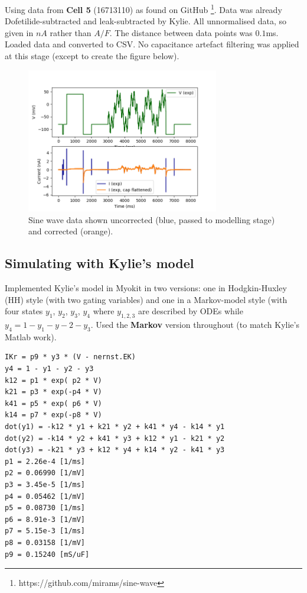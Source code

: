 \documentclass[preprint,authoryear,10pt]{elsarticle}
\begin{document}
Using data from \textbf{Cell 5} (16713110) as found on GitHub
 \footnote{https://github.com/mirams/sine-wave}.
Data was already Dofetilide-subtracted and leak-subtracted by Kylie.
All unnormalised data, so given in $nA$ rather than $A/F$.
The distance between data points was $0.1$ms.
Loaded data and converted to CSV.
No capacitance artefact filtering was applied at this stage (except to create
 the figure below).

\begin{figure}[H]
\centerline{
\includegraphics[width=0.75\textwidth]{fig/sine-wave-data}
}
\caption{%
Sine wave data shown uncorrected (blue, passed to modelling stage) and
 corrected (orange).
}
\label{fig:overview}
\end{figure}



\subsection{Simulating with Kylie's model}

Implemented Kylie's model in Myokit in two versions: one in Hodgkin-Huxley (HH)
 style (with two gating variables) and one in a Markov-model style (with four
 states $y_1$, $y_2$, $y_3$, $y_4$ where $y_{1,2,3}$ are described by ODEs
 while $y_4 = 1 - y_1 - y-2 - y_3$.
Used the \textbf{Markov} version throughout (to match Kylie's Matlab work).

\begin{verbatim}
IKr = p9 * y3 * (V - nernst.EK)
y4 = 1 - y1 - y2 - y3
k12 = p1 * exp( p2 * V)
k21 = p3 * exp(-p4 * V)
k41 = p5 * exp( p6 * V)
k14 = p7 * exp(-p8 * V)
dot(y1) = -k12 * y1 + k21 * y2 + k41 * y4 - k14 * y1
dot(y2) = -k14 * y2 + k41 * y3 + k12 * y1 - k21 * y2
dot(y3) = -k21 * y3 + k12 * y4 + k14 * y2 - k41 * y3
p1 = 2.26e-4 [1/ms]
p2 = 0.06990 [1/mV]
p3 = 3.45e-5 [1/ms]
p4 = 0.05462 [1/mV]
p5 = 0.08730 [1/ms]
p6 = 8.91e-3 [1/mV]
p7 = 5.15e-3 [1/ms]
p8 = 0.03158 [1/mV]
p9 = 0.15240 [mS/uF]
\end{verbatim}
\end{document}
